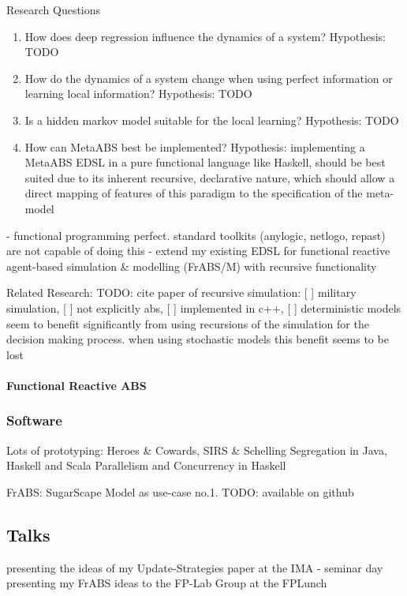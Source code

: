 Research Questions
\begin{enumerate}
	\item How does deep regression influence the dynamics of a system? Hypothesis: TODO
	\item How do the dynamics of a system change when using perfect information or learning local information? Hypothesis: TODO
	\item Is a hidden markov model suitable for the local learning? Hypothesis: TODO
	\item How can MetaABS best be implemented? Hypothesis: implementing a MetaABS EDSL in a pure functional language like Haskell, should be best suited due to its inherent recursive, declarative nature, which should allow a direct mapping of features of this paradigm to the specification of the meta-model
\end{enumerate}

- functional programming perfect. standard toolkits (anylogic, netlogo, repast) are not capable of doing this
- extend my existing EDSL for functional reactive agent-based simulation \& modelling (FrABS/M) with recursive functionality
 
Related Research:
TODO: \cite{gilmer_recursive_2000} cite paper of recursive simulation: [ ] military simulation, [ ] not explicitly abs, [ ] implemented in c++, [ ] deterministic models seem to benefit significantly from using recursions of the simulation for the decision making process. when using stochastic models this benefit seems to be lost


\paragraph{Functional Reactive ABS}

\subsubsection{Software}
Lots of prototyping:
Heroes \& Cowards, SIRS \& Schelling Segregation in Java, Haskell and Scala
Parallelism and Concurrency in Haskell

FrABS: SugarScape Model as use-case no.1. TODO: available on github

\subsection{Talks}
presenting the ideas of my Update-Strategies paper at the IMA - seminar day
presenting my FrABS ideas to the FP-Lab Group at the FPLunch

